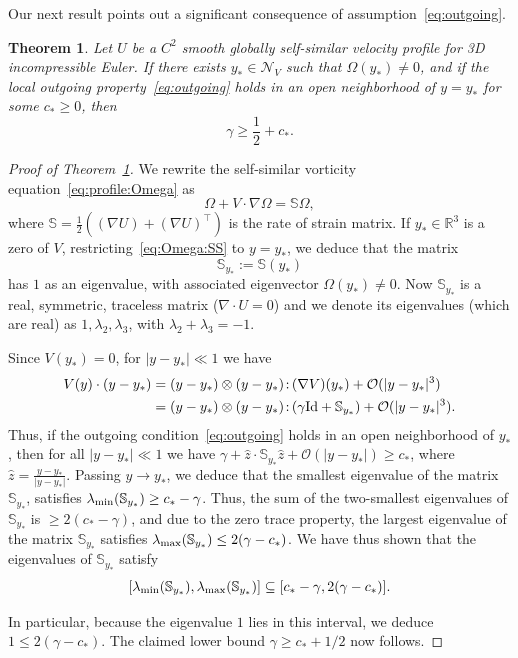 \documentclass[11pt,reqno]{amsproc}
\numberwithin{equation}{section}
\newtheorem{theorem}{Theorem}[section]
\theoremstyle{remark}
\begin{document}
Our next result points out a significant consequence of assumption~\eqref{eq:outgoing}.
\begin{theorem}
\label{thm:outgoing:one:half}
Let $U$ be a $C^2$ smooth globally self-similar velocity profile for 3D incompressible Euler. If there exists $y_* \in \mathcal{N}_V$  such that $\Omega(y_*)\neq 0$, and if  the local outgoing property~\eqref{eq:outgoing} holds \emph{in an open neighborhood} of $y=y_*$ for some $c_* \geq0$, then
\[
\gamma \geq \frac 12 + c_*.
\]
\end{theorem}
\begin{proof}[Proof of Theorem~\ref{thm:outgoing:one:half}]
We rewrite the self-similar vorticity equation~\eqref{eq:profile:Omega} as
\begin{equation}
\label{eq:Omega:SS}
\Omega + V \cdot \nabla \Omega = \mathbb{S} \Omega,
\end{equation}
where  $\mathbb{S} = \frac 12 ( (\nabla U) + (\nabla U)^\intercal)$ is the rate of strain matrix.  If $y_* \in \mathbb{R}^3$ is a zero of $V$, restricting~\eqref{eq:Omega:SS} to $y=y_*$,  we deduce that the matrix
\[
\mathbb{S}_{y_*} := \mathbb{S}(y_*)
\] 
has $1$ as an eigenvalue, with associated eigenvector $\Omega(y_*) \neq 0$. 
Now $\mathbb{S}_{y_*}$ is a real, symmetric, traceless matrix ($\nabla \cdot U = 0$) and we denote its  eigenvalues (which are real) as $1,\lambda_2, \lambda_3$, with $\lambda_2 + \lambda_3 = -1$.

Since $V(y_*) = 0$, for $|y-y_*|\ll 1$ we  have 
\begin{align*}
V(y) \cdot (y-y_*)
&=
(y-y_*) \otimes (y-y_*) \colon \! (\nabla V)(y_*) 
+
\mathcal{O}(|y-y_*|^3)
\notag\\
&= 
(y-y_*) \otimes (y-y_*) \colon \!  ( \gamma \mathrm{Id} + \mathbb{S}_{y_*} ) 
+ 
\mathcal{O}(|y-y_*|^3) .
\end{align*} 
Thus, if the outgoing condition~\eqref{eq:outgoing} holds in an open neighborhood of $y_*$, then for all $|y-y_*|\ll1$ we have 
$\gamma + \hat{z} \cdot \mathbb{S}_{y_*} \hat{z} + \mathcal{O}(|y-y_*|) \geq c_*$, where $\hat{z} = \frac{y-y_*}{|y-y_*|}$. Passing $y \to y_*$, we deduce that the smallest eigenvalue of the matrix $\mathbb{S}_{y_*}$, satisfies $\lambda_{\rm min}(\mathbb{S}_{y_*}) \geq c_* - \gamma$. Thus, the sum of the two-smallest eigenvalues of $\mathbb{S}_{y_*}$ is $\geq 2 (c_* - \gamma)$, and due to the zero trace property, the largest eigenvalue of the matrix $\mathbb{S}_{y_*}$ satisfies $\lambda_{\rm max}(\mathbb{S}_{y_*}) \leq 2(\gamma-c_*)$. We have thus shown that the eigenvalues of $\mathbb{S}_{y_*}$ satisfy
\[
[\lambda_{\rm min}(\mathbb{S}_{y_*}),\lambda_{\rm max}(\mathbb{S}_{y_*})]\subseteq [c_* - \gamma, 2(\gamma -c_*)].
\] 

In particular, because the eigenvalue $1$ lies in this interval,  we deduce $1 \leq 2 (\gamma-c_*)$. The claimed lower bound $\gamma \geq c_* + 1/2$ now follows.
\end{proof}
\end{document}
